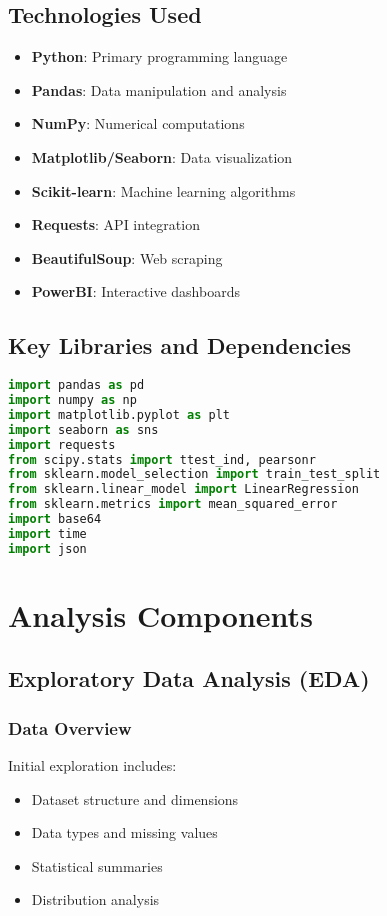 \documentclass[12pt,a4paper]{article}
\begin{document}
\subsection{Technologies Used}
\begin{itemize}
    \item \textbf{Python}: Primary programming language
    \item \textbf{Pandas}: Data manipulation and analysis
    \item \textbf{NumPy}: Numerical computations
    \item \textbf{Matplotlib/Seaborn}: Data visualization
    \item \textbf{Scikit-learn}: Machine learning algorithms
    \item \textbf{Requests}: API integration
    \item \textbf{BeautifulSoup}: Web scraping
    \item \textbf{PowerBI}: Interactive dashboards
\end{itemize}

\subsection{Key Libraries and Dependencies}
\begin{lstlisting}[language=Python]
import pandas as pd
import numpy as np
import matplotlib.pyplot as plt
import seaborn as sns
import requests
from scipy.stats import ttest_ind, pearsonr
from sklearn.model_selection import train_test_split
from sklearn.linear_model import LinearRegression
from sklearn.metrics import mean_squared_error
import base64
import time
import json
\end{lstlisting}

\section{Analysis Components}

\subsection{Exploratory Data Analysis (EDA)}
\subsubsection{Data Overview}
Initial exploration includes:
\begin{itemize}
    \item Dataset structure and dimensions
    \item Data types and missing values
    \item Statistical summaries
    \item Distribution analysis
\end{itemize}
\end{document}
